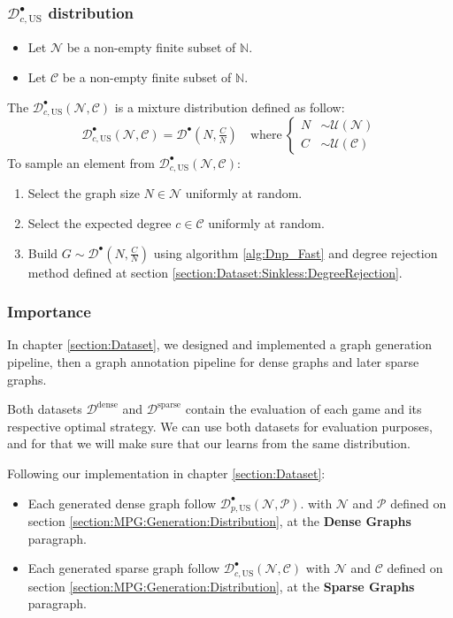 	\subsubsection{$\mathcal{D}^\bullet_{c,\text{US}}$ distribution}
	\begin{itemize}
		\item Let $\mathcal{N}$ be a non-empty finite subset of $\mathbb{N}.$ 
		\item Let $\mathcal{C}$ be a non-empty finite subset of $\mathbb{N}.$
	\end{itemize}
	The $\mathcal{D}^\bullet_{c,\text{US}}(\mathcal{N},\mathcal{C})$ is a mixture distribution defined as follow:
	\begin{equation*}
		\mathcal{D}^\bullet_{c,\text{US}}(\mathcal{N},\mathcal{C}) = \mathcal{D}^\bullet(N,\tfrac{C}{N}) \quad \text{where}\ \begin{cases}
			N &\sim \mathcal{U}(\mathcal{N}) \\
			C &\sim \mathcal{U}(\mathcal{C})
		\end{cases}
	\end{equation*}
		To sample an element from $\mathcal{D}^\bullet_{c,\text{US}}(\mathcal{N},\mathcal{C})$:
	\begin{enumerate}
		\item Select the graph size $N\in\mathcal{N}$ uniformly at random.
		\item Select the expected degree $c\in\mathcal{C}$ uniformly at random.
		\item Build $G\sim \mathcal{D}^\bullet(N,\tfrac{C}{N})$ using algorithm \ref{alg:Dnp_Fast} and degree rejection method defined at section \ref{section:Dataset:Sinkless:DegreeRejection}.
	\end{enumerate} 
\subsubsection{Importance}
In chapter \ref{section:Dataset}, we designed and implemented a graph generation pipeline, then a graph annotation pipeline for dense graphs and later sparse graphs.

Both datasets $\mathcal{D}^\text{dense}$ and $\mathcal{D}^\text{sparse}$ contain the evaluation of each game and its respective optimal strategy. We can use both datasets for evaluation purposes, and for that we will make sure that our learns from the same distribution.

Following our implementation in chapter \ref{section:Dataset}: 
\begin{itemize}
	\item Each generated dense graph follow $\mathcal{D}^\bullet_{p,\text{US}}(\mathcal{N},\mathcal{P}).$ with $\mathcal{N}$ and $\mathcal{P}$ defined on section \ref{section:MPG:Generation:Distribution}, at the \textbf{Dense Graphs} paragraph.
	\item Each generated sparse graph follow $\mathcal{D}^\bullet_{c,\text{US}}(\mathcal{N},\mathcal{C})$ with $\mathcal{N}$ and $\mathcal{C}$ defined on section \ref{section:MPG:Generation:Distribution}, at the \textbf{Sparse Graphs} paragraph.
\end{itemize} 
	
